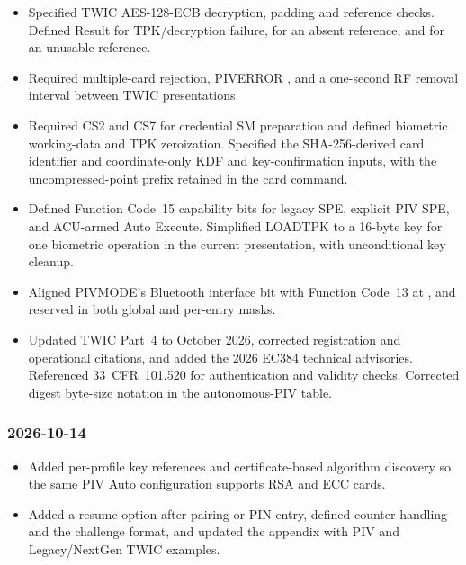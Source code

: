 \begin{itemize}
    alternate-biometric matching, with FASC-N and transaction binding under 33~CFR~101.105
    and~101.520(c).
  \item Specified TWIC AES-128-ECB decryption, padding and reference checks. Defined Result
     for TPK/decryption failure,  for an absent reference, and  for
    an unusable reference.
  \item Required multiple-card rejection, PIVERROR , and a one-second RF removal
    interval between TWIC presentations.
  \item Required CS2 and CS7 for credential SM preparation and defined biometric working-data and
    TPK zeroization. Specified the SHA-256-derived card identifier and coordinate-only KDF and
    key-confirmation inputs, with the uncompressed-point prefix retained in the card command.
  \item Defined Function Code~15 capability bits for legacy SPE, explicit PIV SPE, and ACU-armed
    Auto Execute. Simplified LOADTPK to a 16-byte key for one biometric operation in the current
    presentation, with unconditional key cleanup.
  \item Aligned PIVMODE's Bluetooth interface bit with Function Code~13 at , and reserved
     in both global and per-entry masks.
  \item Updated TWIC Part~4 to October 2026, corrected registration and operational citations, and
    added the 2026 EC384 technical advisories. Referenced 33~CFR~101.520 for authentication and
    validity checks. Corrected digest byte-size notation in the autonomous-PIV table.
\end{itemize}

\subsubsection*{2026-10-14}
\begin{itemize}
  \item Added per-profile key references and certificate-based algorithm discovery so the same PIV
    Auto configuration supports RSA and ECC cards.
  \item Added a resume option after pairing or PIN entry, defined counter handling and the challenge
    format, and updated the appendix with PIV and Legacy/NextGen TWIC examples.
\end{itemize}

